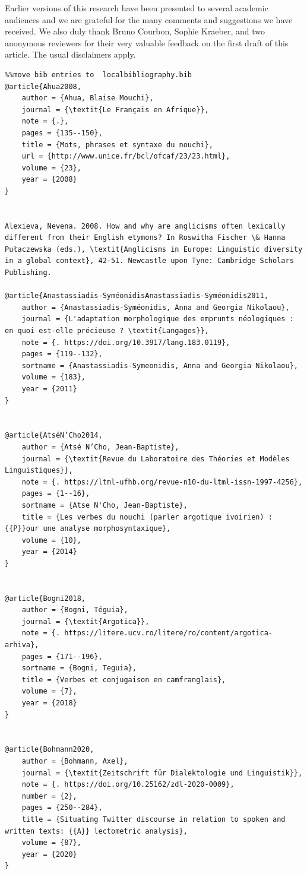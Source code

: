 \documentclass[output=paper]{langscibook}
\begin{document}
Earlier versions of this research have been presented to several academic audiences and we are grateful for the many comments and suggestions we have received. We also duly thank Bruno Courbon, Sophie Kraeber, and two anonymous reviewers for their very valuable feedback on the first draft of this article. The usual disclaimers apply.
\begin{verbatim}%%move bib entries to  localbibliography.bib
@article{Ahua2008,
	author = {Ahua, Blaise Mouchi},
	journal = {\textit{Le Français en Afrique}},
	note = {.},
	pages = {135--150},
	title = {Mots, phrases et syntaxe du nouchi},
	url = {http://www.unice.fr/bcl/ofcaf/23/23.html},
	volume = {23},
	year = {2008}
}


Alexieva, Nevena. 2008. How and why are anglicisms often lexically different from their English etymons? In Roswitha Fischer \& Hanna Pułaczewska (eds.), \textit{Anglicisms in Europe: Linguistic diversity in a global context}, 42-51. Newcastle upon Tyne: Cambridge Scholars Publishing.

@article{Anastassiadis-SyméonidisAnastassiadis-Syméonidis2011,
	author = {Anastassiadis-Syméonidis, Anna and Georgia Nikolaou},
	journal = {L'adaptation morphologique des emprunts néologiques : en quoi est-elle précieuse ? \textit{Langages}},
	note = {. https://doi.org/10.3917/lang.183.0119},
	pages = {119--132},
	sortname = {Anastassiadis-Symeonidis, Anna and Georgia Nikolaou},
	volume = {183},
	year = {2011}
}


@article{AtséN’Cho2014,
	author = {Atsé N’Cho, Jean-Baptiste},
	journal = {\textit{Revue du Laboratoire des Théories et Modèles Linguistiques}},
	note = {. https://ltml-ufhb.org/revue-n10-du-ltml-issn-1997-4256},
	pages = {1--16},
	sortname = {Atse N'Cho, Jean-Baptiste},
	title = {Les verbes du nouchi (parler argotique ivoirien) : {{P}}our une analyse morphosyntaxique},
	volume = {10},
	year = {2014}
}


@article{Bogni2018,
	author = {Bogni, Téguia},
	journal = {\textit{Argotica}},
	note = {. https://litere.ucv.ro/litere/ro/content/argotica-arhiva},
	pages = {171--196},
	sortname = {Bogni, Teguia},
	title = {Verbes et conjugaison en camfranglais},
	volume = {7},
	year = {2018}
}


@article{Bohmann2020,
	author = {Bohmann, Axel},
	journal = {\textit{Zeitschrift für Dialektologie und Linguistik}},
	note = {. https://doi.org/10.25162/zdl-2020-0009},
	number = {2},
	pages = {250--284},
	title = {Situating Twitter discourse in relation to spoken and written texts: {{A}} lectometric analysis},
	volume = {87},
	year = {2020}
}



\end{verbatim}
\end{document}
